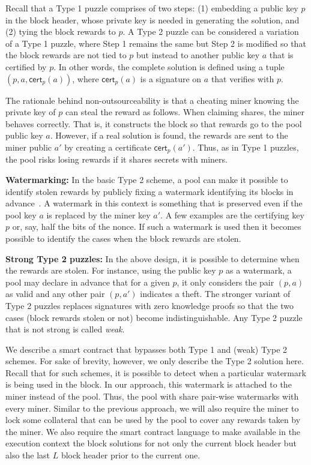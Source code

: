 \documentclass{llncs}
\begin{document}
Recall that a Type 1 puzzle comprises of two steps: (1) embedding a public key $p$ in the block header, whose private key is needed in generating the solution, and (2) tying the block rewards to $p$. 
A Type 2 puzzle can be considered a variation of a Type 1 puzzle, where Step 1 remains the same but Step 2 is modified so that the block rewards are not tied to $p$ but instead to another public key $a$ that is certified by $p$. In other words, the complete solution is defined using a tuple $(p, a, \textsf{cert}_p(a))$, where $\textsf{cert}_p(a)$ is a signature on $a$ that verifies with $p$. 

The rationale behind non-outsourceability is that a cheating miner knowing the private key of $p$ can steal the reward as follows. When claiming shares, the miner behaves correctly. That is, it constructs the block so that rewards go to the pool public key $a$. However, if a real solution is found, the rewards are sent to the miner public $a'$ by creating a certificate $\textsf{cert}_p(a')$. Thus, as in Type 1 puzzles, the pool risks losing rewards if it shares secrets with miners. 


\textbf{Watermarking:} In the basic Type 2 scheme, a pool can make it possible to identify stolen rewards by publicly fixing a watermark identifying its blocks in advance~\cite{miller2015nonoutsourceable}. A watermark in this context is something that is preserved even if the pool key $a$ is replaced by the miner key $a'$. A few examples are the certifying key $p$ or, say, half the bits of the nonce. If such a watermark is used then it becomes possible to identify the cases when the block rewards are stolen. 

\textbf{Strong Type 2 puzzles:} In the above design, it is possible to determine when the rewards are stolen. For instance, using the public key $p$ as a watermark, a pool may declare in advance that for a given $p$, it only considers the pair $(p, a)$ as valid and any other pair $(p, a')$ indicates a theft. The stronger variant of Type 2 puzzles replaces signatures with zero knowledge proofs so that the two cases (block rewards stolen or not) become indistinguishable. Any Type 2 puzzle that is not strong is called {\em weak}.

We describe a smart contract that bypasses both Type 1 and (weak) Type 2 schemes. For sake of brevity, however, we only describe the Type 2 solution here. Recall that for such schemes, it is possible to detect when a particular watermark is being used in the block. In our approach, this watermark is attached to the miner instead of the pool. Thus, the pool with share pair-wise watermarks with every miner. Similar to the previous approach, we will also require the miner to lock some collateral that can be used by the pool to cover any rewards taken by the miner.
We also require the smart contract language to make available in the execution context the block solutions for not only the current block header but also the last $L$ block header prior to the current one. 
\end{document}
